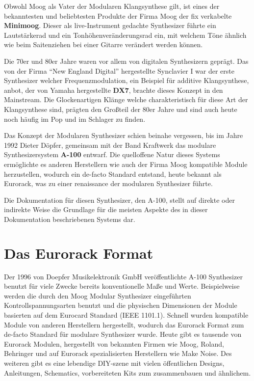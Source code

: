 Obwohl Moog als Vater der Modularen Klangsynthese gilt, ist eines der bekanntesten und beliebtesten Produkte der Firma Moog der fix verkabelte \textbf{Minimoog}. Dieser als live-Instrument gedachte Synthesizer führte ein Lautstärkerad und ein Tonhöhenveränderungsrad ein, mit welchem Töne ähnlich wie beim Saitenziehen bei einer Gitarre verändert werden können.

Die 70er und 80er Jahre waren vor allem von digitalen Synthesizern geprägt. Das von der Firma "`New England Digital"' hergestellte Synclavier I war der erste Synthesizer welcher Frequenzmodulation, ein Beispiel für additive Klangsynthese, anbot, der von Yamaha hergestellte \textbf{DX7}, brachte dieses Konzept in den Mainstream. Die Glockenartigen Klänge welche charakteristisch für diese Art der Klangsynthese sind, prägten den Großteil der 80er Jahre und sind auch heute noch häufig im Pop und im Schlager zu finden.

Das Konzept der Modularen Synthesizer schien beinahe vergessen, bis im Jahre 1992 Dieter Döpfer, gemeinsam mit der Band Kraftwerk das modulare Synthesizersystem \textbf{A-100} entwarf. Die quelloffene Natur dieses Systems ermöglichte es anderen Herstellern wie auch der Firma Moog kompatible Module herzustellen, wodurch ein de-facto Standard entstand, heute bekannt als Eurorack, was zu einer renaissance der modularen Synthesizer führte.

Die Dokumentation für diesen Synthesizer, den A-100, stellt auf direkte oder indirekte Weise die Grundlage für die meisten Aspekte des in dieser Dokumentation beschriebenen Systems dar.

\section{Das Eurorack Format}
\label{sec:orgc6abc7b}

Der 1996 von Doepfer Musikelektronik GmbH veröffentlichte A-100 Synthesizer benutzt für viele Zwecke bereits konventionelle Maße und Werte. Beispielweise werden die durch den Moog Modular Synthesizer eingeführten Kontrollspannungsarten benutzt und die physischen Dimensionen der Module basierten auf dem Eurocard Standard (IEEE 1101.1). Schnell wurden kompatible Module von anderen Herstellern hergestellt, wodurch das Eurorack Format zum de-facto Standard für modulare Synthesizer wurde. Heute gibt es tausende von Eurorack Modulen, hergestellt von bekannten Firmen wie Moog, Roland, Behringer und auf Eurorack spezialisierten Herstellern wie Make Noise. Des weiteren gibt es eine lebendige DIY-szene mit vielen öffentlichen Designs, Anleitungen, Schematics, vorbereiteten Kits zum zusammenbauen und ähnlichem.

